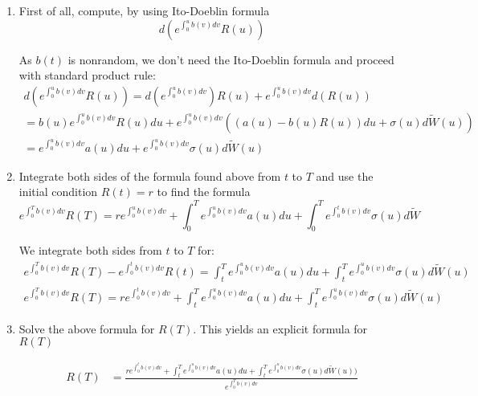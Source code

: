 \documentclass[12pt,twoside, letter]{exam}
\theoremstyle{definition}
\begin{document}
  \begin{enumerate}
    \item First of all, compute, by using Ito-Doeblin formula
      \begin{equation*}
        d(e^{\int^u_0 b(v) dv}R(u))
      \end{equation*}
      \begin{solution}
        As $b(t)$ is nonrandom, we don't need the Ito-Doeblin formula and proceed with standard product rule:
        \begin{align*}
          d(e^{\int^u_0 b(v) dv}R(u)) = d(e^{\int^u_0 b(v) dv})R(u) + e^{\int^u_0 b(v) dv}d(R(u)) \\
          = b(u)e^{\int^u_0 b(v) dv} R(u) du + e^{\int^u_0 b(v) dv}((a(u) - b(u)R(u))du + \sigma(u) d\tilde{W}(u)) \\
          = e^{\int^u_0 b(v) dv}a(u)du + e^{\int^u_0 b(v) dv}\sigma(u) d\tilde{W}(u)
        \end{align*}
      \end{solution}
    \item Integrate both sides of the formula found above from $t$ to $T$ and use the initial
      condition $R(t) = r$ to find the formula
      \begin{equation*}
        e^{\int^T_0 b(v) dv} R(T) = re^{\int^u_0 b(v)dv} + \int^T_0 e^{\int^u_0 b(v)dv} a(u)du
        + \int^T_0 e^{\int^t_0 b(v)dv} \sigma(u) d\tilde{W}
      \end{equation*}
      \begin{solution}
        We integrate both sides from $t$ to $T$ for:
        \begin{align*}
          e^{\int^T_0 b(v) dv}R(T) - e^{\int^t_0 b(v) dv}R(t) = \int^T_t e^{\int^u_0 b(v) dv}a(u)du + \int^T_t e^{\int^u_0 b(v) dv}\sigma(u) d\tilde{W}(u) \\
          e^{\int^T_0 b(v) dv}R(T) = re^{\int^t_0 b(v) dv} + \int^T_t e^{\int^u_0 b(v) dv}a(u)du + \int^T_t e^{\int^u_0 b(v) dv}\sigma(u) d\tilde{W}(u)
        \end{align*}
      \end{solution}
    \item Solve the above formula for $R(T)$. This yields an explicit formula for $R(T)$
      \begin{solution}
        \begin{align*}
          R(T) &= \frac{re^{\int^t_0 b(v) dv} + \int^T_t e^{\int^u_0 b(v) dv}a(u)du + \int^T_t e^{\int^u_0 b(v) dv}\sigma(u) d\tilde{W}(u))}{e^{\int^T_0 b(v) dv}} \\

\end{align*}
\end{solution}
\end{enumerate}
\end{document}
